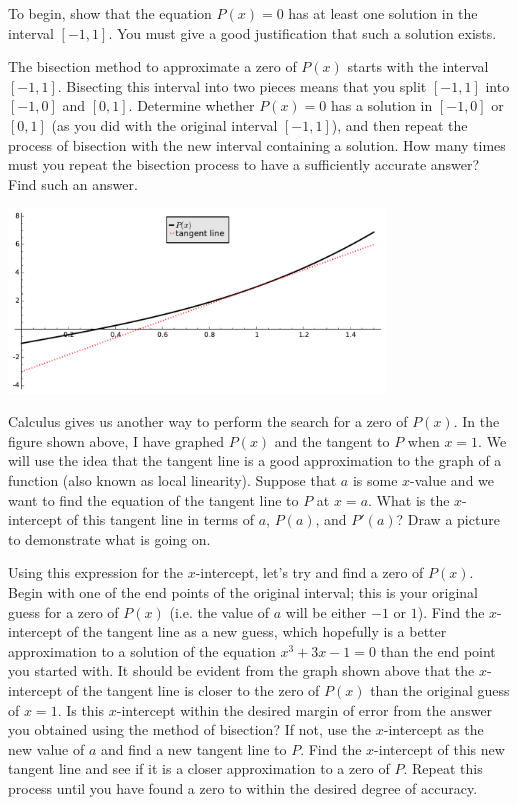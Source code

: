\documentclass
[justified,nohyper]
{tufte-handout}
\theoremstyle{mydef}
\begin{document}
To begin, show that the equation $P(x)=0$ has at least one solution in the interval $[-1,1]$. You must give a good justification that such a solution exists.

The bisection method to approximate a zero of $P(x)$ starts with the interval $[-1,1]$. Bisecting this interval into two pieces means that you split $[-1,1]$ into $[-1,0]$ and $[0,1]$. Determine whether $P(x)=0$ has a solution in $[-1,0]$ or $[0,1]$ (as you did with the original interval $[-1,1]$), and then repeat the process of bisection with the new interval containing a solution. How many times must you repeat the bisection process to have a sufficiently accurate answer? Find such an answer.

\newpage

\includegraphics[width=10cm]{p_of_x.pdf}

Calculus gives us another way to perform the search for a zero of $P(x)$. In the figure shown above, I have graphed $P(x)$ and the tangent to $P$ when $x=1$. We will use the idea that the tangent line is a good approximation to the graph of a function (also known as local linearity). Suppose that $a$ is some $x$-value and we want to find the equation of the tangent line to $P$ at $x=a$. What is the $x$-intercept of this tangent line in terms of $a$, $P(a)$, and $P'(a)$? Draw a picture to demonstrate what is going on.

Using this expression for the $x$-intercept, let's try and find a zero of $P(x)$. Begin with one of the end points of the original interval; this is your original guess for a zero of $P(x)$ (i.e. the value of $a$ will be either $-1$ or $1$). Find the $x$-intercept of the tangent line as a new guess, which hopefully is a better approximation to a solution of the equation $x^3+3x-1=0$ than the end point you started with. It should be evident from the graph shown above that the $x$-intercept of the tangent line is closer to the zero of $P(x)$ than the original guess of $x=1$. Is this $x$-intercept within the desired margin of error from the answer you obtained using the method of bisection? If not, use the $x$-intercept as the new value of $a$ and find a new tangent line to $P$. Find the $x$-intercept of this new tangent line and see if it is a closer approximation to a zero of $P$. Repeat this process until you have found a zero to within the desired degree of accuracy.
\end{document}
